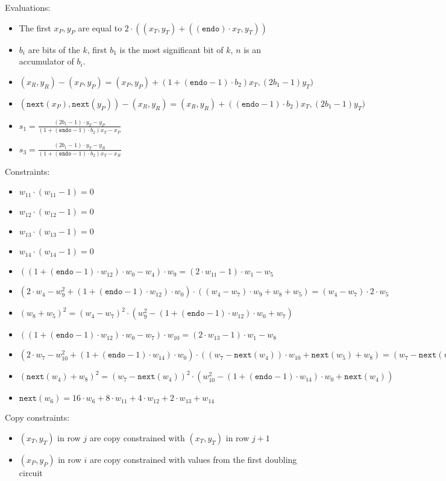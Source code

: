 Evaluations:
\begin{itemize}
	\item The first $x_P, y_P$ are equal to $2 \cdot ((x_T, y_T) + ((\texttt{endo}) \cdot x_T, y_T))$
	\item $b_i$ are bits of the $k$, first $b_1$ is the most significant bit of $k$, $n$ is an accumulator of $b_i$.
	\item $(x_R, y_R) - (x_P, y_P) = (x_P, y_P) + (1 + (\texttt{endo} - 1) \cdot b_2) x_T, (2b_1 - 1)y_T)$
	\item $(\texttt{next}(x_P), \texttt{next}(y_P)) - (x_R, y_R) = (x_R, y_R) + ((\texttt{endo} - 1) \cdot b_2) x_T, (2b_1 - 1)y_T)$
	\item $s_1 = \frac{(2b_1 - 1) \cdot y_T - y_P}{(1 + (\texttt{endo} - 1) \cdot b_2) x_T - x_P}$
	\item $s_3 = \frac{(2b_1 - 1) \cdot y_T - y_R}{(1 + (\texttt{endo} - 1) \cdot b_2) x_T - x_R}$

\end{itemize}

Constraints:
\begin{itemize}
    \item $w_{11} \cdot (w_{11} - 1) = 0$
    \item $w_{12} \cdot (w_{12} - 1) = 0$
    \item $w_{13} \cdot (w_{13} - 1) = 0$
    \item $w_{14} \cdot (w_{14} - 1) = 0$
    \item $((1 + (\texttt{endo} - 1) \cdot w_{12}) \cdot w_{0} - w_{4}) \cdot w_{9} = (2 \cdot w_{11} - 1) \cdot w_{1} - w_{5}$
    \item $(2 \cdot w_{4} - w_{9}^2 + (1 + (\texttt{endo} - 1) \cdot w_{12}) \cdot w_{0}) \cdot ((w_{4} - w_{7}) \cdot w_{9} + w_{8} + w_{5}) = (w_{4} - w_{7}) \cdot 2 \cdot w_{5}$
    \item $(w_{8} + w_{5})^2 = (w_{4} - w_{7})^2 \cdot (w_{9}^2 - (1 + (\texttt{endo} - 1) \cdot w_{12}) \cdot w_{0} + w_{7})$
    \item $((1 + (\texttt{endo} - 1) \cdot w_{12}) \cdot w_{0} - w_{7}) \cdot w_{10} = (2 \cdot w_{13}-1) \cdot w_{1} - w_{8}$
    \item $(2 \cdot w_{7} - w_{10}^2 + (1 + (\texttt{endo} - 1) \cdot w_{14}) \cdot w_{0}) \cdot ((w_{7} - \texttt{next}(w_{4})) \cdot w_{10} + \texttt{next}(w_{5}) + w_{8}) = (w_{7} - \texttt{next}(w_{4})) \cdot 2 \cdot w_{8}$
    \item $(\texttt{next}(w_{4}) + w_{8})^2 = (w_{7} - \texttt{next}(w_{4}))^2 \cdot (w_{10}^2 - (1 + (\texttt{endo} - 1) \cdot w_{14}) \cdot w_{0} + \texttt{next}(w_{4}))$
    \item $\texttt{next}(w_{6}) = 16 \cdot w_{6} + 8 \cdot w_{11} + 4 \cdot w_{12} + 2 \cdot w_{13} + w_{14}$
\end{itemize}

    Copy constraints:
    \begin{itemize}
    \item $(x_T,y_T)$ in row $j$ are copy constrained with $(x_T,y_T)$ in row $j + 1$ 
    \item $(x_P,y_P)$ in row $i$ are copy constrained with values from the first doubling circuit
    \end{itemize}